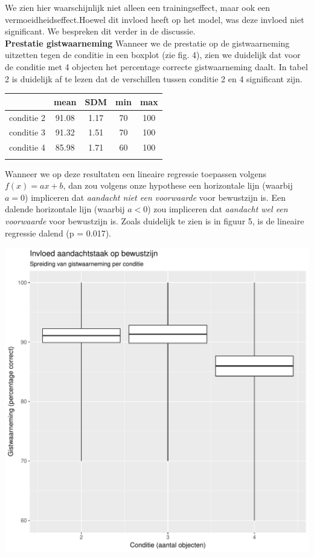 \documentclass[a0,portrait]{a0poster}
\begin{document}
\begin{multicols}{3}
\begin{center}
\end{center}\vspace{1cm}
We zien hier waarschijnlijk niet alleen een trainingseffect, maar ook een vermoeidheidseffect.Hoewel dit invloed heeft op het model, was deze invloed niet significant. We bespreken dit verder in de discussie.\\
\textbf{Prestatie gistwaarneming} Wanneer we de prestatie op de gistwaarneming uitzetten tegen de conditie in een boxplot (zie fig. 4), zien we duidelijk dat voor de conditie met 4 objecten het percentage correcte gistwaarneming daalt. In tabel 2 is duidelijk af te lezen dat de verschillen tussen conditie 2 en 4 significant zijn. 
\begin{center}
\begin{tabular}{c c c c c}
	 &  mean  & SDM & min & max\\
	\hline
	conditie 2 & 91.08 & 1.17 & 70 & 100\\
	conditie 3 & 91.32 & 1.51 & 70 & 100\\
	conditie 4 & 85.98 & 1.71 & 60 & 100\\
	\hline\\
\end{tabular}
\end{center}
Wanneer we op deze resultaten een lineaire regressie toepassen volgens $f(x)=a x+b$, dan zou volgens onze hypothese een horizontale lijn (waarbij $a=0$) impliceren dat \textit{aandacht niet een voorwaarde} voor bewustzijn is. Een dalende horizontale lijn (waarbij $a<0$) zou impliceren dat \textit{aandacht wel een voorwaarde} voor bewustzijn is. Zoals duidelijk te zien is in figuur 5, is de lineaire regressie dalend (p = 0.017).
\begin{center}\vspace{1cm}
	\includegraphics[width=0.8\linewidth]{boxplotGist-conditie.pdf}

\end{center}
\end{multicols}
\end{document}
